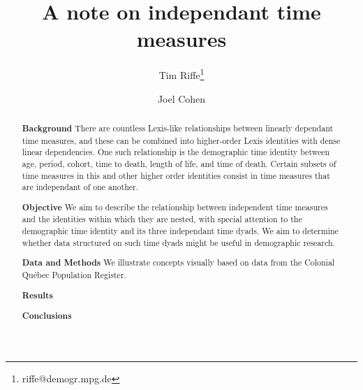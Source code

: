 \newcommand{\absdiv}[1]{%
  \par\addvspace{.5\baselineskip}%
  \noindent\textbf{#1}\quad\ignorespaces
}






\title{A note on independant time measures}

\author[1]{Tim Riffe\thanks{riffe@demogr.mpg.de}}
\author[2]{Joel Cohen}





\maketitle

\vspace{-2em}
\begin{abstract}
\absdiv{Background} There are countless Lexis-like relationships between
linearly dependant time measures, and these can be combined into higher-order
Lexis identities with dense linear dependencies. One such relationship is the demographic time identity between age, period, cohort, time to death,
length of life, and time of death. Certain subsets of time measures in this
and other higher order identities consist in time measures that are independant
of one another.
\absdiv{Objective} We aim to describe the relationship between
independent time measures and the identities within which they are nested, with
special attention to the demographic time identity and its three independant
time dyads. We aim to determine whether data structured on such time dyads might
be useful in demographic research.
\absdiv{Data and Methods} We illustrate concepts visually based on data from the
Colonial Qu\'{e}bec Population Register.
\absdiv{Results}
\absdiv{Conclusions}
\end{abstract}

